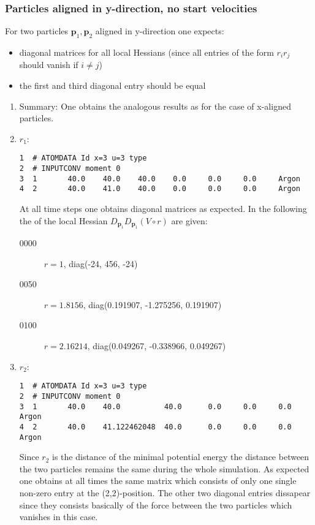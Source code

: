 \documentclass[a4paper]{article}
\newcommand{\boldp}{\boldsymbol{p}}
\begin{document}
\subsubsection{Particles aligned in y-direction, no start velocities}
\label{sec-1-4-2}
For two particles \(\boldp_1, \boldp_2\) aligned in y-direction one expects:
\begin{itemize}
\item diagonal matrices for all local Hessians (since all entries of the form \(r_i r_j\) should vanish if \(i \neq j\))
\item the first and third diagonal entry should be equal
\end{itemize}
\begin{enumerate}
\item Summary:
\label{sec-1-4-2-1}
One obtains the analogous results as for the case of x-aligned particles.
\item \(r_1\):
\label{sec-1-4-2-2}
\begin{verbatim}
1  # ATOMDATA Id x=3 u=3 type
2  # INPUTCONV moment 0
3  1       40.0    40.0    40.0    0.0     0.0     0.0     Argon
4  2       40.0    41.0    40.0    0.0     0.0     0.0     Argon
\end{verbatim}
At all time steps one obtains diagonal matrices as expected.
In the following the of the local Hessian \(D_{\boldp_1} D_{\boldp_1} (V\circ r)\) are given:
\begin{description}
\item[{0000}] \(r = 1\), diag(-24, 456, -24)
\item[{0050}] \(r = 1.8156\), diag(0.191907, -1.275256, 0.191907)
\item[{0100}] \(r = 2.16214\), diag(0.049267, -0.338966, 0.049267)
\end{description}
\item \(r_2\):
\label{sec-1-4-2-3}
\begin{verbatim}
1  # ATOMDATA Id x=3 u=3 type
2  # INPUTCONV moment 0
3  1       40.0    40.0          40.0      0.0     0.0     0.0     Argon
4  2       40.0    41.122462048  40.0      0.0     0.0     0.0     Argon
\end{verbatim}
Since \(r_2\) is the distance of the minimal potential energy the distance between the two particles remains the same during the whole simulation.
As expected one obtains at all times the same matrix which consists of only one single non-zero entry at the (2,2)-position.
The other two diagonal entries dissapear since they consists basically of the force between the two particles which vanishes in this case.

\end{enumerate}
\end{document}
